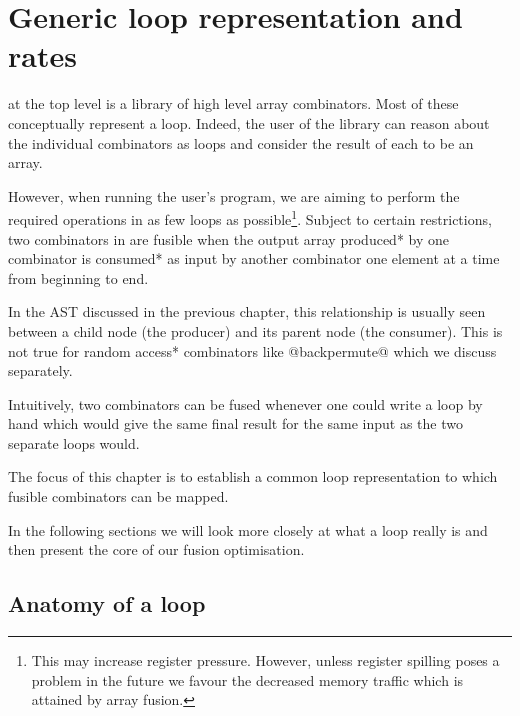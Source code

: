 \documentclass[preamble.tex]{subfiles}
\begin{document}
\clearpage

\chapter{Generic loop representation and rates}
\label{ch:Loops}

\LiveFusion at the top level is a library of high level array combinators. Most of these conceptually represent a loop. Indeed, the user of the library can reason about the individual combinators as loops and consider the result of each to be an array.

However, when running the user's program, we are aiming to perform the required operations in as few loops as possible\footnote{This may increase register pressure. However, unless register spilling poses a problem in the future we favour the decreased memory traffic which is attained by array fusion.}.  Subject to certain restrictions, two combinators in \LiveFusion are fusible when the output array \*produced* by one combinator is \*consumed* as input by another combinator one element at a time from beginning to end.

In the \LiveFusion AST discussed in the previous chapter, this relationship is usually seen between a child node (the producer) and its parent node (the consumer). This is not true for \*random access* combinators like @backpermute@ which we discuss separately.

Intuitively, two combinators can be fused whenever one could write a loop by hand which would give the same final result for the same input as the two separate loops would.

The focus of this chapter is to establish a common loop representation to which fusible combinators can be mapped.

In the following sections we will look more closely at what a loop really is and then present the core of our fusion optimisation.



\clearpage
\section{Anatomy of a loop}
\label{sec:anatomy}
\end{document}
